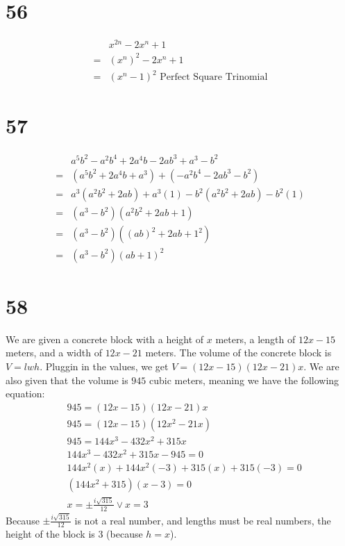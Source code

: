 \documentclass{article}
\theoremstyle{definition}
\begin{document}
\section*{56}
\[
\begin{array}{rl}
	& x^{2n}-2x^n+1 \\
=	& (x^n)^2-2x^n+1 \\
=	& (x^n-1)^2\textrm{ Perfect Square Trinomial}
\end{array}
\]

\section*{57}
\[
\begin{array}{rl}
	& a^5b^2-a^2b^4+2a^4b-2ab^3+a^3-b^2 \\
=	& (a^5b^2+2a^4b+a^3)+(-a^2b^4-2ab^3-b^2) \\
=	& a^3(a^2b^2+2ab)+a^3(1)-b^2(a^2b^2+2ab)-b^2(1) \\
=	& (a^3-b^2)(a^2b^2+2ab+1) \\
=	& (a^3-b^2)((ab)^2+2ab+1^2) \\
=	& (a^3-b^2)(ab+1)^2 
\end{array}
\]

\section*{58}
We are given a concrete block with a height of $x$ meters, a length of $12x-15$ meters, and a width of $12x-21$ meters. The volume of the concrete block is $V=lwh$. 
Pluggin in the values, we get $V=(12x-15)(12x-21)x$. We are also given that the volume is $945$ cubic meters, meaning we have the following equation:
\[
\begin{array}{rl}
	& 945=(12x-15)(12x-21)x \\
	& 945=(12x-15)(12x^2-21x) \\
	& 945=144x^3-432x^2+315x \\
	& 144x^3-432x^2+315x-945=0 \\
	& 144x^2(x)+144x^2(-3)+315(x)+315(-3)=0 \\
	& (144x^2+315)(x-3)=0 \\
	& x=\pm\frac{i\sqrt{315}}{12}\vee x=3
\end{array}
\]
Because $\pm\frac{i\sqrt{315}}{12}$ is not a real number, and lengths must be real numbers, the height of the block is 3 (because $h=x$).
\end{document}
